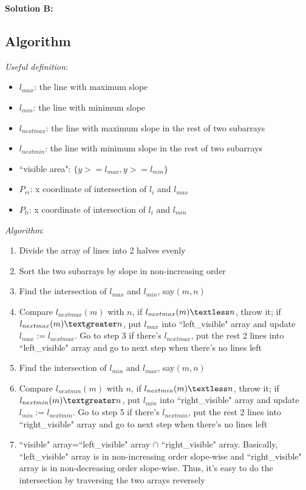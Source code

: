 \documentclass[11pt]{article}
\begin{document}
{\bf Solution B:}

\subsection{Algorithm}
\emph{Useful definition}:
\begin{itemize}
	\item $l_{max}$: the line with maximum slope
	\item $l_{min}$: the line with minimum slope
	\item $l_{nextmax}$: the line with maximum slope in the rest of two subarrays
	\item $l_{nextmin}$: the line with minimum slope in the rest of two subarrays
	\item ``visible area": $\{y>=l_{max}, y>=l_{min}\}$
	\item $P_{ri}$: x coordinate of intersection of $l_{i}$ and $l_{max}$
	\item $P_{li}$: x coordinate of intersection of $l_{i}$ and $l_{min}$
\end{itemize}
\emph{Algorithm}:
\begin{enumerate}
	\item Divide the array of lines into 2 halves evenly
	\item Sort the two subarrays by slope in non-increasing order
	\item Find the intersection of $l_{max}$ and $l_{min}$, say$(m, n)$
	\item Compare $l_{nextmax}(m)$ with $n$,  if $l_{nextmax}(m) \textless n$, throw it; if $l_{nextmax}(m) \textgreater n$, put $l_{max}$ into ``left\_visible" array and update $l_{max} := l_{nextmax}$. Go to step 3 if there's $l_{nextmax}$, put the rest 2 lines into ``left\_visible" array and go to next step when there's no lines left
	\item Find the intersection of $l_{min}$ and $l_{max}$, say$(m, n)$
	\item Compare $l_{nextmin}(m)$ with $n$,  if $l_{nextmin}(m) \textless n$, throw it; if $l_{nextmin}(m) \textgreater n$, put $l_{min}$ into ``right\_visible" array and update $l_{min} := l_{nextmin}$. Go to step 5 if there's $l_{nextmin}$, put the rest 2 lines into ``right\_visible" array and go to next step when there's no lines left
	\item ``visible" array=``left\_visible" array $\cap$ ``right\_visible" array. Basically, ``left\_visible" array is in non-increasing order slope-wise and ``right\_visible" array is in non-decreasing order slope-wise. Thus, it's easy to do the intersection by traversing the two arrays reversely
\end{enumerate}
\end{document}
